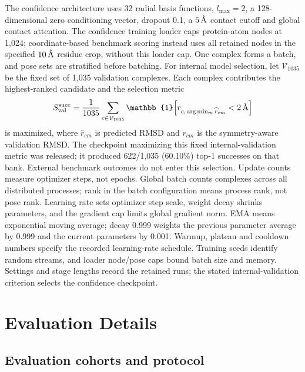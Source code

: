 \documentclass{article}
\newcommand{\angstrom}{\text{\normalfont\AA}}
\begin{document}
The confidence architecture uses 32 radial basis functions, $l_{\max}=2$, a 128-dimensional zero conditioning vector, dropout 0.1, a $5\,\angstrom$ contact cutoff and global contact attention. The confidence training loader caps protein-atom nodes at 1,024; coordinate-based benchmark scoring instead uses all retained nodes in the specified $10\,\angstrom$ residue crop, without this loader cap.
One complex forms a batch, and pose sets are stratified before batching.
For internal model selection, let \(\mathcal V_{1035}\) be the fixed set of 1,035 validation complexes. Each complex contributes the highest-ranked candidate and the selection metric
\begin{equation}
    S_{\mathrm{val}}^{\mathrm{succ}}
    =\frac{1}{1035}
      \sum_{c\in\mathcal{V}_{1035}}
      \mathbb{1}\!\left[
        r_{c,\,\arg\min_m \widehat r_{cm}}<2\,\angstrom
      \right]
    \label{eq:si_confidence_checkpoint_selection}
\end{equation}
is maximized, where \(\widehat r_{cm}\) is predicted RMSD and \(r_{cm}\) is the symmetry-aware validation RMSD.
The checkpoint maximizing this fixed internal-validation metric was released; it produced 622/1,035 (60.10\%) top-1 successes on that bank.
External benchmark outcomes do not enter this selection.
Update counts measure optimizer steps, not epochs. Global batch counts complexes across all distributed processes; rank in the batch configuration means process rank, not pose rank. Learning rate sets optimizer step scale, weight decay shrinks parameters, and the gradient cap limits global gradient norm. EMA means exponential moving average; decay 0.999 weights the previous parameter average by 0.999 and the current parameters by 0.001. Warmup, plateau and cooldown numbers specify the recorded learning-rate schedule. Training seeds identify random streams, and loader node/pose caps bound batch size and memory. Settings and stage lengths record the retained runs; the stated internal-validation criterion selects the confidence checkpoint.

\section{Evaluation Details}
\label{si:evaluation_contract}

\subsection{Evaluation cohorts and protocol}
\end{document}
